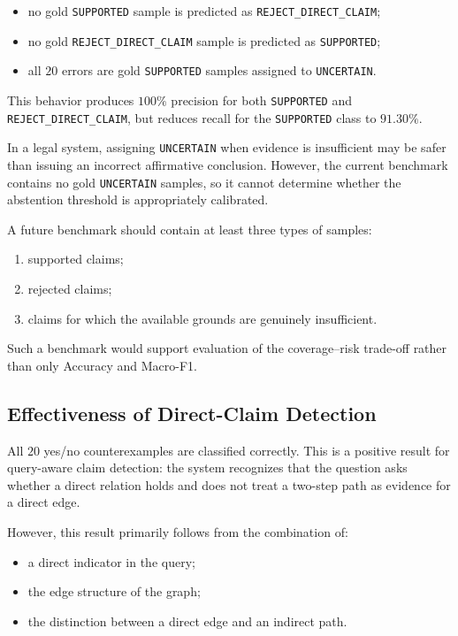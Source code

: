 \begin{itemize}
    \item no gold \texttt{SUPPORTED} sample is predicted as
    \texttt{REJECT\_DIRECT\_CLAIM};

    \item no gold \texttt{REJECT\_DIRECT\_CLAIM} sample is predicted as
    \texttt{SUPPORTED};

    \item all \(20\) errors are gold \texttt{SUPPORTED} samples assigned to
    \texttt{UNCERTAIN}.
\end{itemize}

This behavior produces \(100\%\) precision for both \texttt{SUPPORTED} and
\texttt{REJECT\_DIRECT\_CLAIM}, but reduces recall for the
\texttt{SUPPORTED} class to \(91.30\%\).

In a legal system, assigning \texttt{UNCERTAIN} when evidence is insufficient
may be safer than issuing an incorrect affirmative conclusion. However, the
current benchmark contains no gold \texttt{UNCERTAIN} samples, so it cannot
determine whether the abstention threshold is appropriately calibrated.

A future benchmark should contain at least three types of samples:

\begin{enumerate}
    \item supported claims;
    \item rejected claims;
    \item claims for which the available grounds are genuinely
    insufficient.
\end{enumerate}

Such a benchmark would support evaluation of the coverage--risk trade-off
rather than only Accuracy and Macro-F1.

\subsection{Effectiveness of Direct-Claim Detection}

All \(20\) yes/no counterexamples are classified correctly. This is a
positive result for query-aware claim detection: the system recognizes that
the question asks whether a direct relation holds and does not treat a
two-step path as evidence for a direct edge.

However, this result primarily follows from the combination of:

\begin{itemize}
    \item a direct indicator in the query;
    \item the edge structure of the graph;
    \item the distinction between a direct edge and an indirect path.
\end{itemize}

